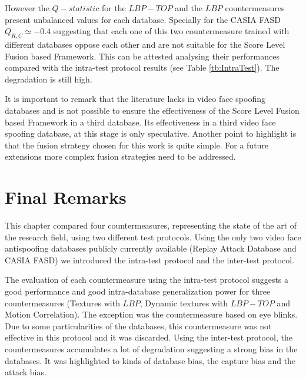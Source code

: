 However the $Q-statistic$ for the $LBP-TOP$ and the $LBP$ countermeasures present unbalanced values for each database. Specially for the CASIA FASD $Q_{R,C}\simeq-0.4$ suggesting that each one of this two countermeasure trained with different databases oppose each other and are not suitable for the Score Level Fusion based Framework. This can be attested analysing their performances compared with the intra-test protocol results (see Table \ref{tb:IntraTest}). The degradation is still high.


It is important to remark that the literature lacks in video face spoofing databases and is not possible to ensure the effectiveness of the Score Level Fusion based Framework in a third database. Its effectiveness in a third video face spoofing database, at this stage is only speculative. Another point to highlight is that the fusion strategy chosen for this work is quite simple. For a future extensions more complex fusion strategies need to be addressed.

\section{Final Remarks}
\label{sec:Experiments_finalremarks}

This chapter compared four countermeasures, representing the state of the art of the research field, using two different test protocols. Using the only two video face antispoofing databases publicly currently available (Replay Attack Database and CASIA FASD) we introduced the intra-test protocol and the inter-test protocol.

The evaluation of each countermeasure using the intra-test protocol suggests a good performance and good intra-database generalization power for three countermeasures (Textures with $LBP$, Dynamic textures with $LBP-TOP$  and Motion Correlation). The exception was the countermeasure based on eye blinks. Due to some particularities of the databases, this countermeasure was not effective in this protocol and it was discarded. Using the inter-test protocol, the countermeasures accumulates a lot of degradation suggesting a strong bias in the databases. It was highlighted to kinds of database bias, the capture bias and the attack bias.

